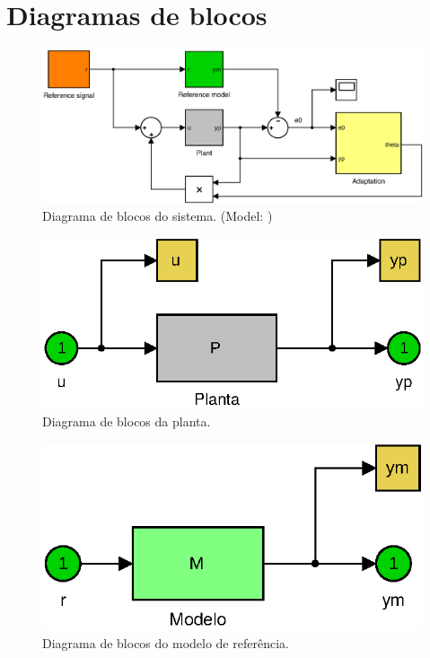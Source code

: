 ﻿%
\section{Diagramas de blocos}


\begin{figure}[H]
  \centering
  \includegraphics[width=14cm]{figs/blocks/MRAC_111_8_5.eps}
  \caption{Diagrama de blocos do sistema. \quad
  (Model: ) }
\end{figure}

\bigskip%
\begin{figure}[H]
  \centering
  \includegraphics[scale=0.8]{figs/blocks/plant.eps}
  \caption{Diagrama de blocos da planta.}
\end{figure}

\bigskip%
\begin{figure}[H]
  \centering
  \includegraphics[scale=0.8]{figs/blocks/reference-model.eps}
  \caption{Diagrama de blocos do modelo de referência.}
\end{figure}

